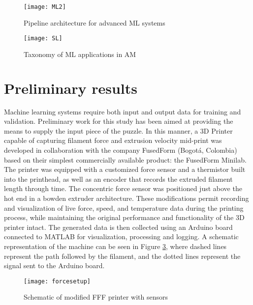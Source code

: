 \documentclass[main.tex]{subfiles}
\begin{document}
\begin{figure}[!htbp]
	\center
	\texttt{[image: ML2]}
	\caption{Pipeline architecture for advanced ML systems \cite{Geron2019}} \label{fig:pipeline}
\end{figure}

\begin{figure}[!htbp]
	\center
	\texttt{[image: SL]}
	\caption{Taxonomy of ML applications in AM \cite{Meng2020}} \label{fig:supL}
\end{figure}

\section{Preliminary results} \label{sec:prelim}

Machine learning systems require both input and output data for training and validation. Preliminary work for this study has been aimed at providing the means to supply the input piece of the puzzle. In this manner, a 3D Printer capable of capturing filament force and extrusion velocity mid-print was developed in collaboration with the company FusedForm (Bogot\'{a}, Colombia) based on their simplest commercially available product: the FusedForm Minilab. The printer was equipped with a customized force sensor and a thermistor built into the printhead, as well as an encoder that records the extruded filament length through time. The concentric force sensor was positioned just above the hot end in a bowden extruder architecture. These modifications permit recording and visualization of live force, speed, and temperature data during the printing process, while maintaining the original performance and functionality of the 3D printer intact. The generated data is then collected using an Arduino board connected to MATLAB for visualization, processing and logging. A schematic representation of the machine can be seen in Figure \ref{fig:shakira}, where dashed lines represent the path followed by the filament, and the dotted lines represent the signal sent to the Arduino board.

\begin{figure}[!htbp]
	\center
	\texttt{[image: forcesetup]}
	\caption{Schematic of modified FFF printer with sensors} \label{fig:shakira}
\end{figure}
\end{document}
